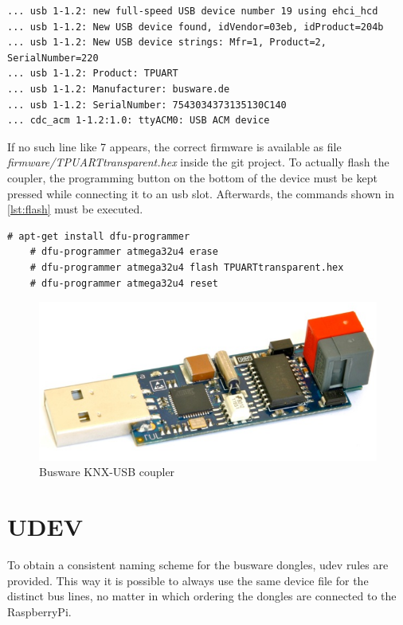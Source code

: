 \begin{lstlisting}[style=BashInputStyle,label=lst:device]
... usb 1-1.2: new full-speed USB device number 19 using ehci_hcd
... usb 1-1.2: New USB device found, idVendor=03eb, idProduct=204b
... usb 1-1.2: New USB device strings: Mfr=1, Product=2, SerialNumber=220
... usb 1-1.2: Product: TPUART
... usb 1-1.2: Manufacturer: busware.de
... usb 1-1.2: SerialNumber: 7543034373135130C140
... cdc_acm 1-1.2:1.0: ttyACM0: USB ACM device
\end{lstlisting}

If no such line like 7 appears, the correct firmware is available as file \textit{firmware/TPUARTtransparent.hex} inside the git project. To actually flash the 
coupler, the programming button on the bottom of the device must be kept pressed while connecting it to an \gls{usb} slot. Afterwards, the commands shown
in \ref{lst:flash} must be executed.

\begin{lstlisting}[style=BashInputStyle,label=lst:flash]
    # apt-get install dfu-programmer
    # dfu-programmer atmega32u4 erase
    # dfu-programmer atmega32u4 flash TPUARTtransparent.hex
    # dfu-programmer atmega32u4 reset
\end{lstlisting}


\begin{figure}
    \centering
    \caption{Busware KNX-USB coupler}
    \label{fig:busware}
\includegraphics[scale=0.2]{figures/busware.png}
\end{figure}

\section{UDEV}

To obtain a consistent naming scheme for the busware dongles, udev rules are provided. This way it is possible to always use the same
device file for the distinct bus lines, no matter in which ordering the dongles are connected to the RaspberryPi.

